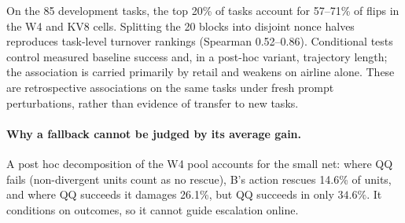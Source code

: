 On the 85 development tasks, the top 20\% of tasks account for 57--71\% of flips in the W4 and KV8 cells. Splitting the 20 blocks into disjoint nonce halves reproduces task-level turnover rankings (Spearman 0.52--0.86). Conditional tests control measured baseline success and, in a post-hoc variant, trajectory length; the association is carried primarily by retail and weakens on airline alone. These are retrospective associations on the same tasks under fresh prompt perturbations, rather than evidence of transfer to new tasks. %


\paragraph{Why a fallback cannot be judged by its average gain.} A post hoc decomposition of the \tautwo{} W4 pool accounts for the small net: where QQ fails (non-divergent units count as no rescue), B's action rescues 14.6\% of units, and where QQ succeeds it damages 26.1\%, but QQ succeeds in only $34.6\%$. It conditions on outcomes, so it cannot guide escalation online. %

